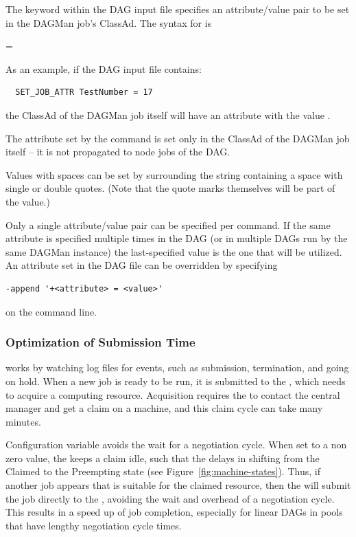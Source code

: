 The  keyword within the DAG input file specifies
an attribute/value pair to be set in the DAGMan job's ClassAd.
The syntax for  is

 =

As an example, if the DAG input file contains:
\begin{verbatim}
  SET_JOB_ATTR TestNumber = 17
\end{verbatim}
the ClassAd of the DAGMan job itself will have an attribute
 with the value .

The attribute set by the  command is set only
in the ClassAd of the DAGMan job itself -- it is not propagated to
node jobs of the DAG.

Values with spaces can be set by surrounding the string containing a
space with single or double quotes.  (Note that the quote marks
themselves will be part of the value.)

Only a single attribute/value pair can be specified per
 command.  If the same attribute is specified
multiple times in the DAG (or in multiple DAGs run by the same
DAGMan instance) the last-specified value is the one that will
be utilized.  An attribute set in the DAG file can be overridden
by specifying
\begin{verbatim}
-append '+<attribute> = <value>'
\end{verbatim}
on the  command line.

\subsubsection{\label{sec:MultipleDAGs}Optimization of Submission Time}

 works by watching log files for events, such as submission,
termination, and going on hold.
When a new job is ready to be run, it is submitted to the , 
which needs to acquire a computing resource. 
Acquisition requires the  to contact the central
manager and get a claim on a machine,
and this claim cycle can take many minutes.

Configuration variable
avoids the wait for a negotiation cycle.
When set to a non zero value, 
the  keeps a claim idle,
such that the  delays in shifting from
the Claimed to the Preempting state (see Figure~\ref{fig:machine-states}).
Thus, if another job appears that is suitable for the claimed resource,
then the  will submit the job directly to the , 
avoiding the wait and overhead of a negotiation cycle.
This results in a speed up of job completion,
especially for linear DAGs in pools that have lengthy negotiation cycle times.

